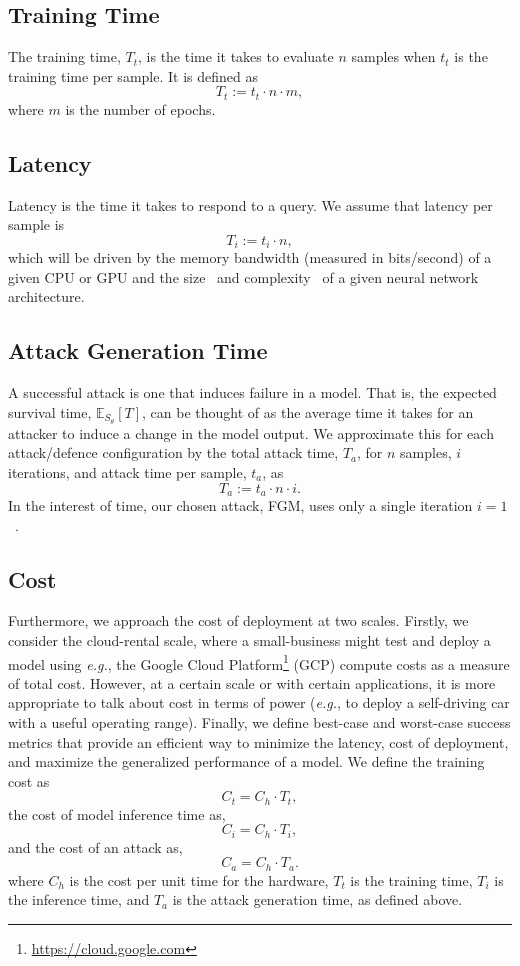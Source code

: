 \documentclass[conference]{IEEEtran}
\begin{document}
{\subsection{Training Time}

The training time, $T_t$, is the time it takes to evaluate $n$ samples when $t_t$ is the training time per sample. It is defined as
$$
    T_t := t_t \cdot n  \cdot m,
$$
where $m$ is the number of epochs.


\subsection{Latency}

Latency is the time it takes to respond to a query. We assume that latency per sample is
$$
    T_i := t_i \cdot n,
$$
which will be driven by the memory bandwidth (measured in bits/second) of a given CPU or GPU and the size~\cite{vgg} and complexity~\cite{resnet} of a given neural network architecture.


\subsection{Attack Generation Time}

A successful attack is one that induces failure in a model. That is, the expected survival time, $\mathbb{E}_{S_\theta}[T]$, can be thought of as the average time it takes for an attacker to induce a change in the model output. We approximate this for each attack/defence configuration by the total attack time, $T_a$, for $n$ samples, $i$ iterations, and attack time per sample, $t_a$, as
\begin{equation}
    \label{attack_time}
    T_a := t_a \cdot n \cdot i.
\end{equation}
In the interest of time, our chosen attack, FGM, uses only a single iteration $i =1$~\cite{fgm}.


\subsection{Cost}

Furthermore, we approach the cost of deployment at two scales. Firstly, we consider the cloud-rental scale, where a small-business might test and deploy a model using \textit{e.g.}, the Google Cloud Platform\footnote{\href{https://cloud.google.com}{https://cloud.google.com}} (GCP) compute costs as a measure of total cost. However, at a certain scale or with certain applications, it is  more appropriate to talk about cost in terms of power (\textit{e.g.}, to deploy a self-driving car with a useful operating range). Finally, we define best-case and worst-case success metrics that provide an efficient way to minimize the latency, cost of deployment, and 
maximize the generalized performance of a model. We define the training cost as
$$
    C_t = C_h \cdot T_t,
$$
the cost of model inference time as,
$$
    C_i = C_h \cdot T_i,
$$
and the cost of an attack as,
$$
    C_a = C_h \cdot T_a.
$$
where $C_h$ is the cost per unit time for the hardware, $T_t$ is the training time, $T_i$ is the inference time, and $T_a$ is the attack generation time, as defined above.


}
\end{document}
